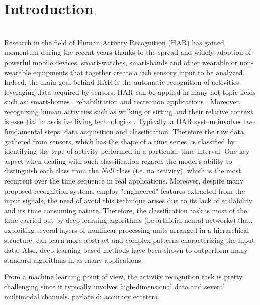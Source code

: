 
\section{Introduction}
\label{sec:introduction}

\\

Research in the field of Human Activity Recognition (HAR) has gained momentum during the recent years thanks to the spread and widely adoption of powerful mobile devices, smart-watches, smart-bands and other wearable or non-wearable equipments that together create a rich sensory input to be analyzed. Indeed, the main goal behind HAR is the automatic recognition of activities leveraging data acquired by sensors. HAR can be applied in many hot-topic fields such as: smart-homes \cite{Rashidi-2009}, rehabilitation \cite{Patel-2012} and recreation applications \cite{Lara-2013}. Moreover, recognizing human activities such as walking or sitting and their relative context is essential in assistive living technologies \cite{Avci-2010}. Typically, a HAR system involves two fundamental steps: data acquisition and classification. Therefore the raw data gathered from sensors, which has the shape of a time series, is classified by identifying the type of activity performed in a particular time interval.  One key aspect when dealing with such classification regards the model's ability to distinguish each class from the \textit{Null} class (i.e. no activity), which is the most recurrent over the time sequence in real applications. Moreover, despite many proposed recognition systems employ "engineered" features extracted from the input signals, the need of avoid this technique arises due to its lack of scalability and its time consuming nature. Therefore, the classification task is most of the time carried out by deep learning algorithms (i.e artificial neural networks) that, exploiting several layers of nonlinear processing units arranged in a hierarchical structure, can learn more abstract and complex patterns characterizing the input data. Also, deep learning based methods have been shown to outperform many standard algorithms in as many applications.

From a machine learning point of view, the activity recognition task is pretty challenging since it typically involves high-dimensional data and several multimodal channels.  parlare di accuracy eccetera


